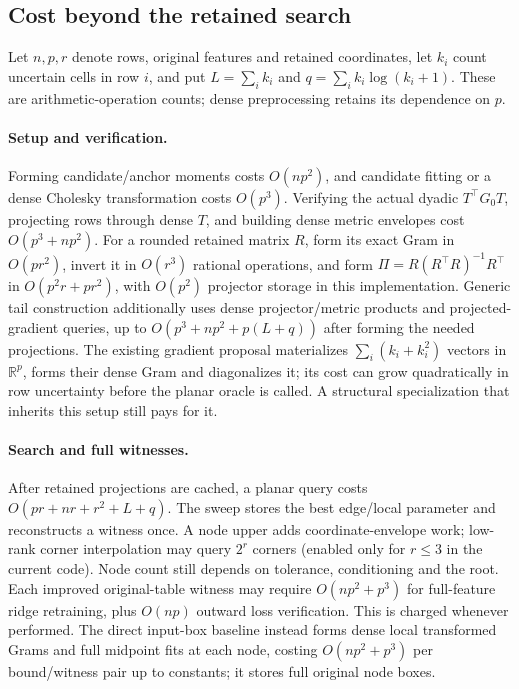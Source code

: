 \subsection{Cost beyond the retained search}\label{app:cost}
Let $n,p,r$ denote rows, original features and retained coordinates, let $k_i$ count uncertain cells in row $i$, and put $L=\sum_i k_i$ and $q=\sum_i k_i\log(k_i+1)$. These are arithmetic-operation counts; dense preprocessing retains its dependence on $p$.

\paragraph{Setup and verification.}
Forming candidate/anchor moments costs $O(np^2)$, and candidate fitting or a dense Cholesky transformation costs $O(p^3)$. Verifying the actual dyadic $T^\top G_0T$, projecting rows through dense $T$, and building dense metric envelopes cost $O(p^3+np^2)$. For a rounded retained matrix $R$, form its exact Gram in $O(pr^2)$, invert it in $O(r^3)$ rational operations, and form $\Pi=R(R^\top R)^{-1}R^\top$ in $O(p^2r+pr^2)$, with $O(p^2)$ projector storage in this implementation. Generic tail construction additionally uses dense projector/metric products and projected-gradient queries, up to $O(p^3+np^2+p(L+q))$ after forming the needed projections. The existing gradient proposal materializes $\sum_i(k_i+k_i^2)$ vectors in $\mathbb R^p$, forms their dense Gram and diagonalizes it; its cost can grow quadratically in row uncertainty before the planar oracle is called. A structural specialization that inherits this setup still pays for it.

\paragraph{Search and full witnesses.}
After retained projections are cached, a planar query costs $O(pr+nr+r^2+L+q)$. The sweep stores the best edge/local parameter and reconstructs a witness once. A node upper adds coordinate-envelope work; low-rank corner interpolation may query $2^r$ corners (enabled only for $r\leq3$ in the current code). Node count still depends on tolerance, conditioning and the root. Each improved original-table witness may require $O(np^2+p^3)$ for full-feature ridge retraining, plus $O(np)$ outward loss verification. This is charged whenever performed. The direct input-box baseline instead forms dense local transformed Grams and full midpoint fits at each node, costing $O(np^2+p^3)$ per bound/witness pair up to constants; it stores full original node boxes.

